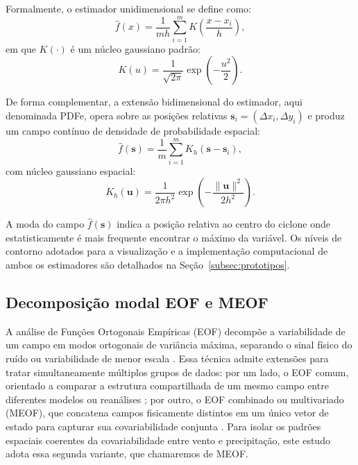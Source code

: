 Formalmente, o estimador unidimensional se define como:
\begin{equation}\label{eq:tb_kde_pdf}
\hat{f}(x) = \frac{1}{m h} \sum_{i=1}^{m} K\!\left(\frac{x - x_i}{h}\right),
\end{equation}
em que $K(\cdot)$ é um núcleo gaussiano padrão:
\begin{equation}\label{eq:tb_gaussian_kernel}
K(u) = \frac{1}{\sqrt{2\pi}} \exp\!\left(-\frac{u^2}{2}\right).
\end{equation}

De forma complementar, a extensão bidimensional do estimador, aqui denominada PDFe, opera sobre as posições relativas $\mathbf{s}_i = (\Delta x_i, \Delta y_i)$ e produz um campo contínuo de densidade de probabilidade espacial:
\begin{equation}\label{eq:tb_kde_simple}
\hat{f}(\mathbf{s}) = \frac{1}{m} \sum_{i=1}^{m} K_h(\mathbf{s} - \mathbf{s}_i),
\end{equation}
com núcleo gaussiano espacial:
\begin{equation}\label{eq:tb_gauss_kernel_2d_simple}
K_h(\mathbf{u}) = \frac{1}{2\pi h^2} \exp\!\left(-\frac{\|\mathbf{u}\|^2}{2h^2}\right).
\end{equation}

A moda do campo $\hat{f}(\mathbf{s})$ indica a posição relativa ao centro do ciclone onde
estatisticamente é mais frequente encontrar o máximo da variável.
Os níveis de contorno adotados para a visualização e a implementação computacional de ambos os estimadores são detalhados na Seção~\ref{subsec:prototipos}.

\subsection{Decomposição modal EOF e MEOF}\label{subsec:tb_eof}
A análise de Funções Ortogonais Empíricas (EOF) decompõe a variabilidade de um campo em modos ortogonais de variância máxima, separando o sinal físico do ruído ou variabilidade de menor escala \citep{hannachi2007empirical}.
Essa técnica admite extensões para tratar simultaneamente múltiplos grupos de dados: por um lado, o EOF comum, orientado a comparar a estrutura compartilhada de um mesmo campo entre diferentes modelos ou reanálises \citep{hannachi2023eof}; por outro, o EOF combinado ou multivariado (MEOF), que concatena campos fisicamente distintos em um único vetor de estado para capturar sua covariabilidade conjunta \citep{liang2018multivariate}. Para isolar os padrões espaciais coerentes da covariabilidade entre vento e precipitação, este estudo adota essa segunda variante, que chamaremos de MEOF.

